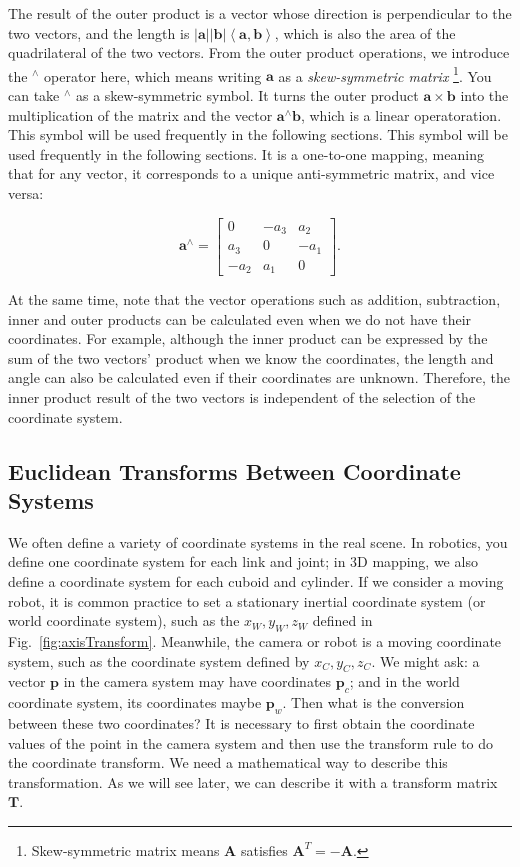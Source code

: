 The result of the outer product is a vector whose direction is perpendicular to the two vectors, and the length is $ \left | \mathbf{a} \right | \left | \mathbf{b} \right | \left \langle { \mathbf {a}, \mathbf {b}} \right \rangle  $, which is also the area of the quadrilateral of the two vectors. From the outer product operations, we introduce the $ ^ \wedge $ operator here, which means writing $ \mathbf{a} $ as a \textit {skew-symmetric matrix} \footnote{Skew-symmetric matrix means $ \mathbf{A} $ satisfies $ \mathbf{A}^T=- \mathbf{A}$. }. You can take $ ^ \wedge $ as a skew-symmetric symbol. It turns the outer product $ \mathbf{a} \times  \mathbf{b} $ into the multiplication of the matrix and the vector $ { \mathbf{a}^ \wedge } \mathbf{b} $, which is a linear operatoration. This symbol will be used frequently in the following sections. This symbol will be used frequently in the following sections. It is a one-to-one mapping, meaning that for any vector, it corresponds to a unique anti-symmetric matrix, and vice versa:

\begin{equation}
\mathbf{a}^\wedge = \left[ {\begin{array}{*{20}{c}}
	0&{-{a_3}}&{{a_2}}\\  
	{{a_3}}&0&{ - {a_1}}\\
	{ - {a_2}}&{{a_1}}&0
	\end{array}} \right].
\end{equation}

At the same time, note that the vector operations such as addition, subtraction, inner and outer products can be calculated even when we do not have their coordinates. For example, although the inner product can be expressed by the sum of the two vectors' product when we know the coordinates, the length and angle can also be calculated even if their coordinates are unknown. Therefore, the inner product result of the two vectors is independent of the selection of the coordinate system.

\subsection{Euclidean Transforms Between Coordinate Systems}
We often define a variety of coordinate systems in the real scene. In robotics, you define one coordinate system for each link and joint; in 3D mapping, we also define a coordinate system for each cuboid and cylinder. If we consider a moving robot, it is common practice to set a stationary inertial coordinate system (or world coordinate system), such as the $x_W, y_W, z_W$ defined in Fig.~\ref{fig:axisTransform}. Meanwhile, the camera or robot is a moving coordinate system, such as the coordinate system defined by $x_C, y_C, z_C$. We might ask: a vector $\mathbf{p}$ in the camera system may have coordinates $\mathbf{p}_c$; and in the world coordinate system, its coordinates maybe $ \mathbf{p}_w$. Then what is the conversion between these two coordinates? It is necessary to first obtain the coordinate values of the point in the camera system and then use the transform rule to do the coordinate transform. We need a mathematical way to describe this transformation. As we will see later, we can describe it with a transform matrix $\mathbf{T}$.

